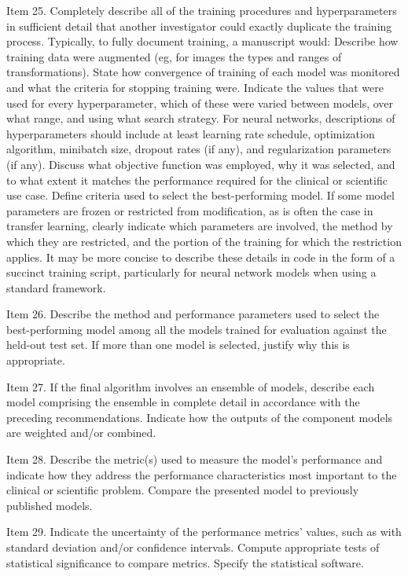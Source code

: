 Item 25. Completely describe all of the training procedures and hyperparameters in sufficient detail that another investigator could exactly duplicate the training process. Typically, to fully document training, a manuscript would: Describe how training data were augmented (eg, for images the types and ranges of transformations). State how convergence of training of each model was monitored and what the criteria for stopping training were. Indicate the values that were used for every hyperparameter, which of these were varied between models, over what range, and using what search strategy. For neural networks, descriptions of hyperparameters should include at least learning rate schedule, optimization algorithm, minibatch size, dropout rates (if any), and regularization parameters (if any). Discuss what objective function was employed, why it was selected, and to what extent it matches the performance required for the clinical or scientific use case. Define criteria used to select the best-performing model. If some model parameters are frozen or restricted from modification, as is often the case in transfer learning, clearly indicate which parameters are involved, the method by which they are restricted, and the portion of the training for which the restriction applies. It may be more concise to describe these details in code in the form of a succinct training script, particularly for neural network models when using a standard framework.

Item 26. Describe the method and performance parameters used to select the best-performing model among all the models trained for evaluation against the held-out test set. If more than one model is selected, justify why this is appropriate.

Item 27. If the final algorithm involves an ensemble of models, describe each model comprising the ensemble in complete detail in accordance with the preceding recommendations. Indicate how the outputs of the component models are weighted and/or combined.

Item 28. Describe the metric(s) used to measure the model’s performance and indicate how they address the performance characteristics most important to the clinical or scientific problem. Compare the presented model to previously published models.

Item 29. Indicate the uncertainty of the performance metrics’ values, such as with standard deviation and/or confidence intervals. Compute appropriate tests of statistical significance to compare metrics. Specify the statistical software.

